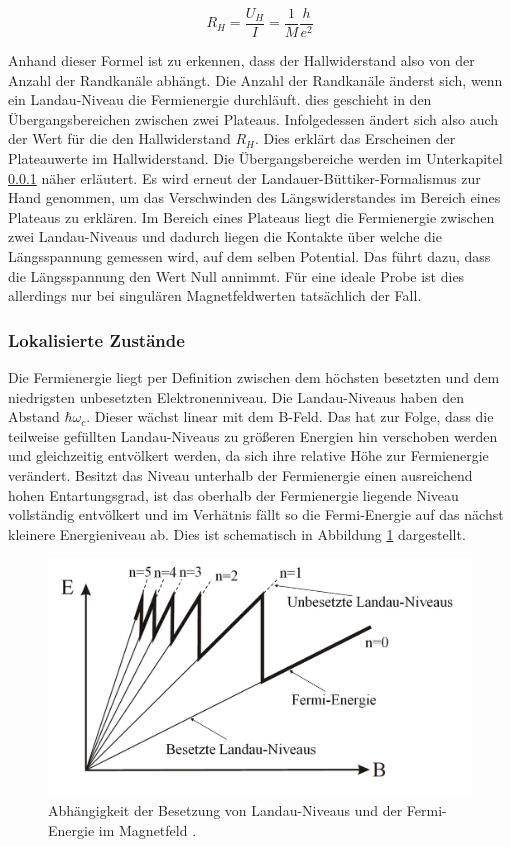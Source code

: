 \begin{equation}
R_H=\frac{U_H}{I}=\frac{1}{M}\frac{h}{e^2}
\label{eq:U_Hall_simpel}
\end{equation}

Anhand dieser Formel ist zu erkennen, dass der Hallwiderstand also von der Anzahl der Randkanäle abhängt. Die Anzahl der Randkanäle änderst sich, wenn ein Landau-Niveau die Fermienergie durchläuft. dies geschieht in den Übergangsbereichen zwischen zwei Plateaus. Infolgedessen ändert sich also auch der Wert für die den Hallwiderstand $R_H$. Dies erklärt das Erscheinen der Plateauwerte im Hallwiderstand. Die Übergangsbereiche werden im Unterkapitel \ref{sec:lokalisierte Zust} näher erläutert. 
Es wird erneut der Landauer-Büttiker-Formalismus zur Hand genommen, um das Verschwinden des Längswiderstandes im Bereich eines Plateaus zu erklären. Im Bereich eines Plateaus liegt die Fermienergie zwischen zwei Landau-Niveaus und dadurch liegen die Kontakte über welche die Längsspannung gemessen wird, auf dem selben Potential. Das führt dazu, dass die Längsspannung den Wert Null annimmt. Für eine ideale Probe ist dies allerdings nur bei singulären Magnetfeldwerten tatsächlich der Fall.


\subsubsection{Lokalisierte Zustände}
\label{sec:lokalisierte Zust}

Die Fermienergie liegt per Definition zwischen dem höchsten besetzten und dem niedrigsten unbesetzten Elektronenniveau. Die Landau-Niveaus haben den Abstand $\hbar\omega_c$. Dieser wächst linear mit dem B-Feld. Das hat zur Folge, dass die teilweise gefüllten Landau-Niveaus zu größeren Energien hin verschoben werden und gleichzeitig entvölkert werden, da sich ihre relative Höhe zur Fermienergie verändert. Besitzt das Niveau unterhalb der Fermienergie einen ausreichend hohen Entartungsgrad, ist das oberhalb der Fermienergie liegende Niveau vollständig entvölkert und im Verhätnis fällt so die Fermi-Energie auf das nächst kleinere Energieniveau ab. Dies ist schematisch in Abbildung \ref{fig:Lokalisierte_Zust_Anleitungsheft} dargestellt.

\begin{figure}[h]
	\centering
	\includegraphics[width=0.7\linewidth]{images/Anleitungsheft/Lokalisierte_Zust_Anleitungsheft.png}
	\caption[Fermi-Energie lokalisierter Zustände]{
		Abhängigkeit der Besetzung von Landau-Niveaus und der Fermi-Energie im Magnetfeld \cite{anleitung}.
	}
	\label{fig:Lokalisierte_Zust_Anleitungsheft}
\end{figure}


